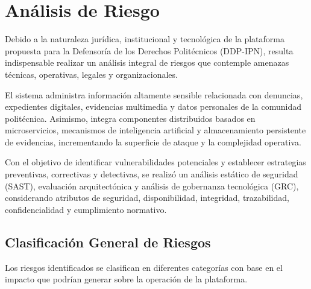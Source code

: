 \documentclass[12pt,oneside,letterpaper]{book}
\begin{document}


\section{Análisis de Riesgo}
\label{sec:analisis_riesgo}

Debido a la naturaleza jurídica, institucional y tecnológica de la plataforma propuesta para la Defensoría de los Derechos Politécnicos (DDP-IPN), resulta indispensable realizar un análisis integral de riesgos que contemple amenazas técnicas, operativas, legales y organizacionales.

El sistema administra información altamente sensible relacionada con denuncias, expedientes digitales, evidencias multimedia y datos personales de la comunidad politécnica. Asimismo, integra componentes distribuidos basados en microservicios, mecanismos de inteligencia artificial y almacenamiento persistente de evidencias, incrementando la superficie de ataque y la complejidad operativa.

Con el objetivo de identificar vulnerabilidades potenciales y establecer estrategias preventivas, correctivas y detectivas, se realizó un análisis estático de seguridad (SAST), evaluación arquitectónica y análisis de gobernanza tecnológica (GRC), considerando atributos de seguridad, disponibilidad, integridad, trazabilidad, confidencialidad y cumplimiento normativo.

\subsection{Clasificación General de Riesgos}

Los riesgos identificados se clasifican en diferentes categorías con base en el impacto que podrían generar sobre la operación de la plataforma.
\end{document}

